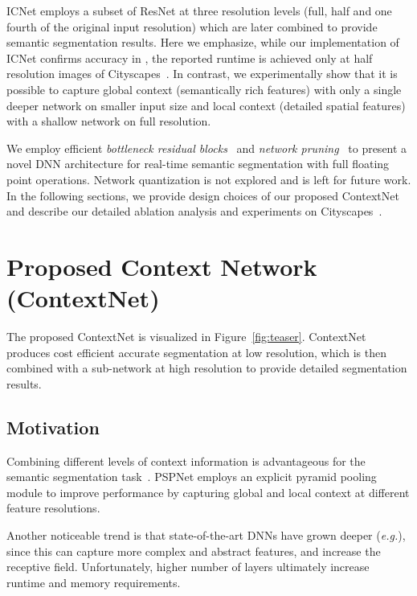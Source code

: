 \documentclass[runningheads]{llncs}
\def\eg{\emph{e.g.}}
\begin{document}
ICNet \cite{zhao2017b} employs a subset of ResNet \cite{he2015} at three resolution levels (full, half and one fourth of the original input resolution) which are later combined to provide semantic segmentation results. Here we emphasize, while our implementation of ICNet confirms accuracy in \cite{zhao2017b}, the reported runtime is achieved only at half resolution images of Cityscapes~\cite{cityscaples2016}. In contrast, we experimentally show that it is possible to capture global context (semantically rich features) with only a single deeper network on smaller input size and local context (detailed spatial features) with a shallow network on full resolution.

We employ efficient \textit{bottleneck residual blocks}~\cite{sandler2018} and \textit{network pruning}~\cite{han2016,li2017} to present a novel DNN architecture for real-time semantic segmentation with full floating point operations. Network quantization is not explored and is left for future work. In the following sections, we provide design choices of our proposed ContextNet and describe our detailed ablation analysis and experiments on Cityscapes~\cite{cityscaples2016}.

\section{Proposed Context Network (ContextNet)}
\label{sec:context-net}
The proposed ContextNet is visualized in Figure~\ref{fig:teaser}. ContextNet produces cost efficient accurate segmentation at low resolution, which is then combined with a sub-network at high resolution to provide detailed segmentation results.

\subsection{Motivation}
Combining different levels of context information is advantageous for the semantic segmentation task~\cite{ronneberger2015,long2016,chen2016}. PSPNet \cite{zhao2017a} employs an explicit pyramid pooling module to improve performance by capturing global and local context at different feature resolutions.

Another noticeable trend is that state-of-the-art DNNs have grown deeper (\eg \cite{he2015,zhao2017a,chen2016}), since this can capture more complex and abstract features, and increase the receptive field. Unfortunately, higher number of layers ultimately increase runtime and memory requirements.
\end{document}
